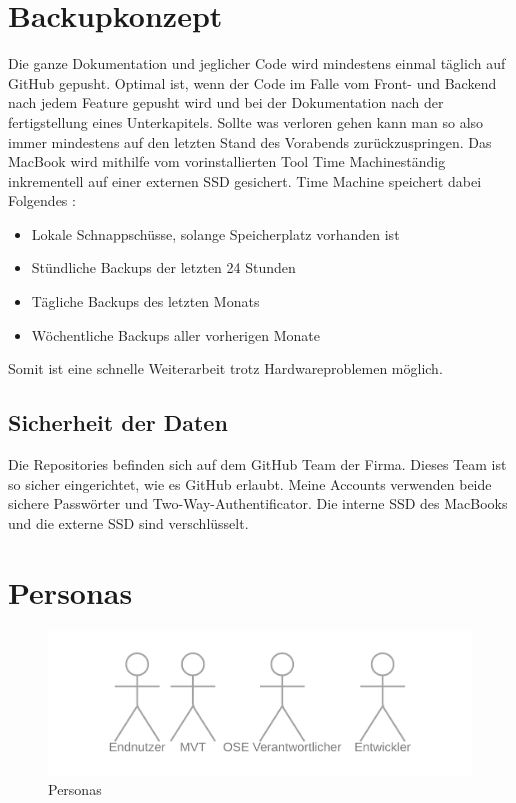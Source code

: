 \section{Backupkonzept}
Die ganze Dokumentation und jeglicher Code wird mindestens einmal täglich auf GitHub gepusht. Optimal ist, wenn der Code im Falle vom Front- und Backend nach jedem Feature gepusht wird und bei der Dokumentation nach der fertigstellung eines Unterkapitels. Sollte was verloren gehen kann man so also immer mindestens auf den letzten Stand des Vorabends zurückzuspringen.
\newline
\newline
Das MacBook wird mithilfe vom vorinstallierten Tool \flqq Time Machine\frqq ständig inkrementell auf einer externen SSD gesichert. Time Machine speichert dabei Folgendes \cite{apple_2021_mit}:
\begin{itemize}
  \item Lokale Schnappschüsse, solange Speicherplatz vorhanden ist
  \item Stündliche Backups der letzten 24 Stunden
  \item Tägliche Backups des letzten Monats
  \item Wöchentliche Backups aller vorherigen Monate
\end{itemize}
Somit ist eine schnelle Weiterarbeit trotz Hardwareproblemen möglich.
\subsection{Sicherheit der Daten}
Die Repositories befinden sich auf dem GitHub Team der Firma. Dieses Team ist so sicher eingerichtet, wie es GitHub erlaubt. Meine Accounts verwenden beide sichere Passwörter und Two-Way-Authentificator.
\newline
Die interne SSD des MacBooks \cite{a2021_hardware} und die externe SSD \cite{a2021_keep} sind verschlüsselt.
\section{Personas}
\begin{figure}[!ht]
  \centering
  \includegraphics[width=0.6\linewidth]{./images/Personas.png}
  \caption[Personas]{Personas}
  \label{fig:personas}
\end{figure}

